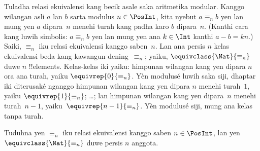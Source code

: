 \documentclass[../../../include/open-logic-section]{subfiles}
\begin{document}
\begin{ex}
Tuladha relasi ekuivalensi kang becik asale saka aritmetika modular.
Kanggo wilangan asli $a$ lan $b$ sarta modulus $n \in \PosInt$,
kita nyebut $a \equiv_n b$ yen lan mung yen
$a$ dipara~$n$ menehi turah kang padha
karo $b$ dipara~$n$.
(Kanthi cara kang luwih simbolis: $a \equiv_n b$ yen lan mung yen
ana $k \in\Int$ kanthi $a - b = kn$.)
Saiki, $\equiv_n$ iku relasi ekuivalensi kanggo saben~$n$.
Lan ana persis $n$ kelas ekuivalensi beda kang kawangun
dening~$\equiv_n$; yaiku, $\equivclass{\Nat}{\equiv_n}$
duwe $n$ !!{element}s.
Kelas-kelas iki yaiku: himpunan wilangan kang yen dipara $n$
ora ana turah, yaiku $\equivrep{0}{\equiv_n}$.
Yèn modulusé luwih saka siji, dhaptar iki diterusaké nganggo
himpunan wilangan kang yen dipara $n$ menehi turah~$1$,
yaiku $\equivrep{1}{\equiv_n}$; \ldots;
lan himpunan wilangan kang yen dipara~$n$ menehi turah~$n-1$,
yaiku~$\equivrep{n-1}{\equiv_n}$. Yèn modulusé siji, mung ana
kelas tanpa turah.
\end{ex}

\begin{prob}
Tuduhna yen $\equiv_n$ iku relasi ekuivalensi kanggo saben
$n \in\PosInt$, lan yen $\equivclass{\Nat}{\equiv_n}$
duwe persis $n$ anggota.
\end{prob}
\end{document}

